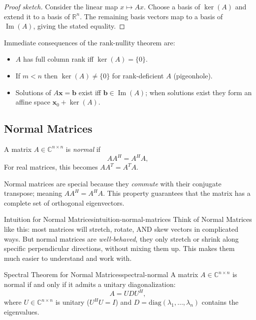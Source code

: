 \documentclass[../../main.tex]{subfiles}
\begin{document}
\begin{proof}[Proof sketch]
    Consider the linear map $x\mapsto Ax$. Choose a basis of $\ker(A)$ and extend it to a basis of $\mathbb{R}^n$. The remaining basis vectors map to a basis of $\operatorname{Im}(A)$, giving the stated equality.
\end{proof}

Immediate consequences of the rank-nullity theorem are:
\begin{itemize}
    \item $A$ has full column rank iff $\ker(A)=\{0\}$.
    \item If $m<n$ then $\ker(A)\neq\{0\}$ for rank-deficient $A$ (pigeonhole).
    \item Solutions of $A\mathbf{x}=\mathbf{b}$ exist iff $\mathbf{b}\in\operatorname{Im}(A)$; when solutions exist they form an affine space $\mathbf{x}_0+\ker(A)$.
\end{itemize}

\subsection{Normal Matrices}
\label{subsec:normal-matrices}

A matrix $A \in \mathbb{C}^{n \times n}$ is \emph{normal} if
\[
    AA^H = A^H A,
\]
For real matrices, this becomes $AA^T = A^TA$.

Normal matrices are special because they \emph{commute} with their conjugate transpose; meaning $A A^H = A^H A$. This property guarantees that the matrix has a complete set of orthogonal eigenvectors.

\begin{remark}{Intuition for Normal Matrices}{intuition-normal-matrices}
    Think of Normal Matrices like this: most matrices will stretch, rotate, AND skew vectors in complicated ways. But normal matrices are \emph{well-behaved}, they only stretch or shrink along specific perpendicular directions, without mixing them up. This makes them much easier to understand and work with.
\end{remark}

\begin{theorem}{Spectral Theorem for Normal Matrices}{spectral-normal}
    A matrix $A \in \mathbb{C}^{n \times n}$ is normal if and only if it admits a unitary diagonalization:
    \[
        A = U D U^H,
    \]
    where $U \in \mathbb{C}^{n \times n}$ is unitary ($U^H U = I$) and $D = \text{diag}(\lambda_1, \ldots, \lambda_n)$ contains the eigenvalues.
\end{theorem}
\end{document}

